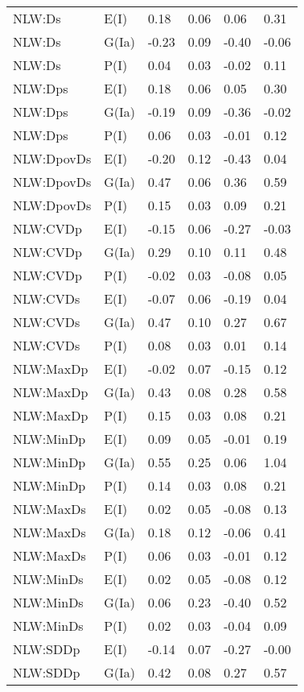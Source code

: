 \begin{center}
\begin{longtable}{|p{1.1in}|p{0.7in}|p{0.7in}|p{0.6in}|p{0.6in}|p{0.6in}|}
  NLW:Ds & E(I) & 0.18 & 0.06 & 0.06 & 0.31 \\ 
  NLW:Ds & G(Ia) & -0.23 & 0.09 & -0.40 & -0.06 \\ 
  NLW:Ds & P(I) & 0.04 & 0.03 & -0.02 & 0.11 \\ 
  NLW:Dps & E(I) & 0.18 & 0.06 & 0.05 & 0.30 \\ 
  NLW:Dps & G(Ia) & -0.19 & 0.09 & -0.36 & -0.02 \\ 
  NLW:Dps & P(I) & 0.06 & 0.03 & -0.01 & 0.12 \\ 
  NLW:DpovDs & E(I) & -0.20 & 0.12 & -0.43 & 0.04 \\ 
  NLW:DpovDs & G(Ia) & 0.47 & 0.06 & 0.36 & 0.59 \\ 
  NLW:DpovDs & P(I) & 0.15 & 0.03 & 0.09 & 0.21 \\ 
  NLW:CVDp & E(I) & -0.15 & 0.06 & -0.27 & -0.03 \\ 
  NLW:CVDp & G(Ia) & 0.29 & 0.10 & 0.11 & 0.48 \\ 
  NLW:CVDp & P(I) & -0.02 & 0.03 & -0.08 & 0.05 \\ 
  NLW:CVDs & E(I) & -0.07 & 0.06 & -0.19 & 0.04 \\ 
  NLW:CVDs & G(Ia) & 0.47 & 0.10 & 0.27 & 0.67 \\ 
  NLW:CVDs & P(I) & 0.08 & 0.03 & 0.01 & 0.14 \\ 
  NLW:MaxDp & E(I) & -0.02 & 0.07 & -0.15 & 0.12 \\ 
  NLW:MaxDp & G(Ia) & 0.43 & 0.08 & 0.28 & 0.58 \\ 
  NLW:MaxDp & P(I) & 0.15 & 0.03 & 0.08 & 0.21 \\ 
  NLW:MinDp & E(I) & 0.09 & 0.05 & -0.01 & 0.19 \\ 
  NLW:MinDp & G(Ia) & 0.55 & 0.25 & 0.06 & 1.04 \\ 
  NLW:MinDp & P(I) & 0.14 & 0.03 & 0.08 & 0.21 \\ 
  NLW:MaxDs & E(I) & 0.02 & 0.05 & -0.08 & 0.13 \\ 
  NLW:MaxDs & G(Ia) & 0.18 & 0.12 & -0.06 & 0.41 \\ 
  NLW:MaxDs & P(I) & 0.06 & 0.03 & -0.01 & 0.12 \\ 
  NLW:MinDs & E(I) & 0.02 & 0.05 & -0.08 & 0.12 \\ 
  NLW:MinDs & G(Ia) & 0.06 & 0.23 & -0.40 & 0.52 \\ 
  NLW:MinDs & P(I) & 0.02 & 0.03 & -0.04 & 0.09 \\ 
  NLW:SDDp & E(I) & -0.14 & 0.07 & -0.27 & -0.00 \\ 
  NLW:SDDp & G(Ia) & 0.42 & 0.08 & 0.27 & 0.57 \\ 

\end{longtable}
\end{center}
